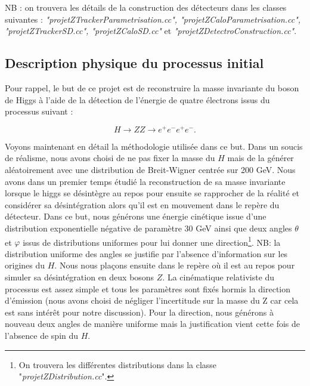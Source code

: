 \documentclass[11pt]{article}
\begin{document}
NB : on trouvera les détails de la construction des détecteurs dans les classes
suivantes : \textit{"projetZTrackerParametrisation.cc",
"projetZCaloParametrisation.cc", "projetZTrackerSD.cc", "projetZCaloSD.cc"} et 
\textit{"projetZDetectroConstruction.cc"}. 



\subsection{Description physique du processus initial}

Pour rappel, le but de ce projet est de reconstruire la masse invariante du
boson de Higgs à l'aide de la détection de l'énergie de quatre électrons issus
du processus suivant :

\begin{equation}
H \longrightarrow ZZ \longrightarrow e^+ e^- e^+ e^-.
\end{equation}

Voyons maintenant en détail la méthodologie utilisée dans ce but. Dans un
soucis de réalisme, nous avons choisi de ne pas fixer la masse du $H$ mais
de la générer aléatoirement avec une distribution de Breit-Wigner centrée sur
200 GeV. Nous avons dans un premier temps étudié la reconstruction de sa masse
invariante lorsque le higgs se désintègre au repos pour ensuite se rapprocher
de la réalité et considérer sa désintégration alors qu'il est en mouvement dans
le repère du détecteur. Dans ce but, nous générons une énergie cinétique issue
d'une distribution exponentielle négative de paramètre 30 GeV ainsi que deux
angles $\theta$ et $\varphi$ issus de distributions uniformes pour lui donner
une direction\footnote{On trouvera les différentes distributions dans la classe
"\textit{projetZDistribution.cc}".}. NB: la distribution uniforme des angles se
justifie par l'absence d'information sur les origines du $H$. Nous nous plaçons
ensuite dans le repère où il est au repos pour simuler sa désintégration en deux
bosons $Z$. La cinématique relativiste du processus est assez simple et tous les
paramètres sont fixés hormis la direction d'émission (nous avons choisi de
négliger l'incertitude sur la masse du Z car cela est sans intérêt pour notre
discussion). Pour la direction, nous générons à nouveau deux angles de manière
uniforme mais la justification vient cette fois de l'absence de spin du $H$. 
\end{document}
